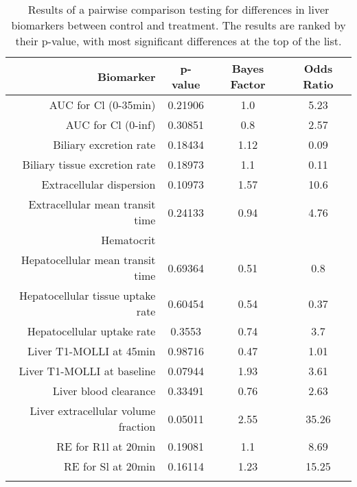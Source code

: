 \documentclass{epflreport}%
\begin{document}
%
\begin{longtable}{rccc}%
\hline%
Biomarker&p{-}value&Bayes Factor&Odds Ratio\\%
\hline%
AUC for Cl (0{-}35min)&0.21906&1.0&5.23\\%
AUC for Cl (0{-}inf)&0.30851&0.8&2.57\\%
Biliary excretion rate&0.18434&1.12&0.09\\%
Biliary tissue excretion rate&0.18973&1.1&0.11\\%
Extracellular dispersion&0.10973&1.57&10.6\\%
Extracellular mean transit time&0.24133&0.94&4.76\\%
Hematocrit&&&\\%
Hepatocellular mean transit time&0.69364&0.51&0.8\\%
Hepatocellular tissue uptake rate&0.60454&0.54&0.37\\%
Hepatocellular uptake rate&0.3553&0.74&3.7\\%
Liver T1{-}MOLLI at 45min&0.98716&0.47&1.01\\%
Liver T1{-}MOLLI at baseline&0.07944&1.93&3.61\\%
Liver blood clearance&0.33491&0.76&2.63\\%
Liver extracellular volume fraction&0.05011&2.55&35.26\\%
RE for R1l at 20min&0.19081&1.1&8.69\\%
RE for Sl at 20min&0.16114&1.23&15.25\\%
\hline%
\caption{Results of a pairwise comparison testing for differences in liver biomarkers between control and treatment. The results are ranked by their p-value, with most significant differences at the top of the list.} \\%
\end{longtable}%
\end{document}
